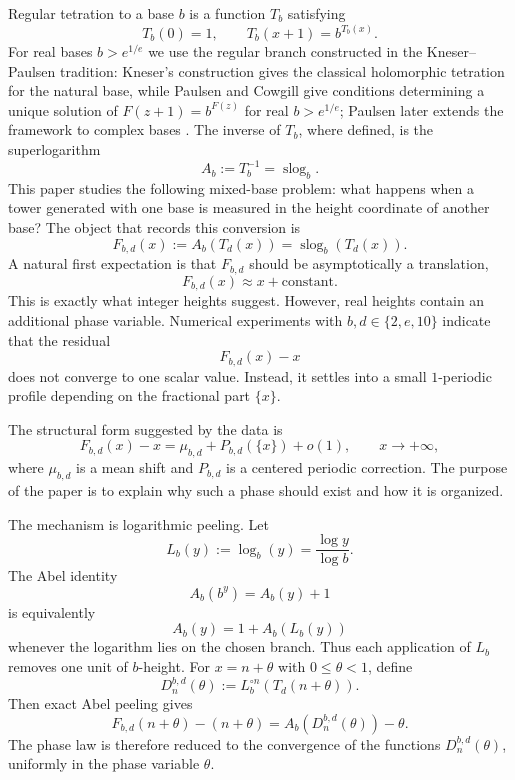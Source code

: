 \documentclass[11pt,a4paper]{article}
\theoremstyle{plain}
\theoremstyle{definition}
\theoremstyle{remark}
\newcommand{\slog}{\operatorname{slog}}
\begin{document}
Regular tetration to a base $b$ is a function $T_b$ satisfying
\begin{equation}\label{eq:tetration}
  T_b(0)=1,\qquad T_b(x+1)=b^{T_b(x)}.
\end{equation}
For real bases $b>e^{1/e}$ we use the regular branch constructed in the Kneser--Paulsen tradition: Kneser's construction gives the classical holomorphic tetration for the natural base, while Paulsen and Cowgill give conditions determining a unique solution of $F(z+1)=b^{F(z)}$ for real $b>e^{1/e}$; Paulsen later extends the framework to complex bases \cite{kneser1950,kouznetsov2009,paulsen-cowgill,paulsen-complex-bases}.  The inverse of $T_b$, where defined, is the superlogarithm
\[
  A_b:=T_b^{-1}=\slog_b.
\]
This paper studies the following mixed-base problem: what happens when a tower generated with one base is measured in the height coordinate of another base?  The object that records this conversion is
\begin{equation}\label{eq:Fbd}
  F_{b,d}(x):=A_b(T_d(x))=\slog_b(T_d(x)).
\end{equation}
A natural first expectation is that $F_{b,d}$ should be asymptotically a translation,
\[
  F_{b,d}(x)\approx x+\text{constant}.
\]
This is exactly what integer heights suggest.  However, real heights contain an additional phase variable.  Numerical experiments with $b,d\in\{2,e,10\}$ indicate that the residual
\[
  F_{b,d}(x)-x
\]
does not converge to one scalar value.  Instead, it settles into a small $1$-periodic profile depending on the fractional part $\{x\}$.

The structural form suggested by the data is
\begin{equation}\label{eq:intro-phase}
  F_{b,d}(x)-x=\mu_{b,d}+P_{b,d}(\{x\})+o(1),\qquad x\to+\infty,
\end{equation}
where $\mu_{b,d}$ is a mean shift and $P_{b,d}$ is a centered periodic correction.  The purpose of the paper is to explain why such a phase should exist and how it is organized.

The mechanism is logarithmic peeling.  Let
\[
  L_b(y):=\log_b(y)=\frac{\log y}{\log b}.
\]
The Abel identity
\begin{equation}\label{eq:abel}
  A_b(b^y)=A_b(y)+1
\end{equation}
is equivalently
\begin{equation}\label{eq:abel-log}
  A_b(y)=1+A_b(L_b(y))
\end{equation}
whenever the logarithm lies on the chosen branch.  Thus each application of $L_b$ removes one unit of $b$-height.  For $x=n+\theta$ with $0\leq\theta<1$, define
\begin{equation}\label{eq:Dndef-intro}
  D_n^{b,d}(\theta):=L_b^{\circ n}(T_d(n+\theta)).
\end{equation}
Then exact Abel peeling gives
\begin{equation}\label{eq:peeling-intro}
  F_{b,d}(n+\theta)-(n+\theta)=A_b(D_n^{b,d}(\theta))-\theta.
\end{equation}
The phase law is therefore reduced to the convergence of the functions $D_n^{b,d}(\theta)$, uniformly in the phase variable $\theta$.
\end{document}
